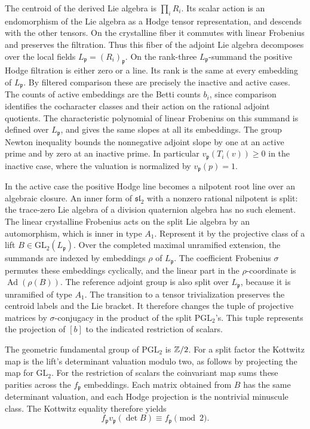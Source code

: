 The centroid of the derived Lie algebra is \(\prod_i R_i\). Its
scalar action is an endomorphism of the Lie algebra as a Hodge tensor
representation, and descends with the other tensors. On the
crystalline fiber it commutes with linear Frobenius and preserves
the filtration. Thus this fiber of the adjoint Lie algebra decomposes
over the local fields \(L_{\mathfrak p}=(R_i)_{\mathfrak p}\).
On the rank-three \(L_{\mathfrak p}\)-summand the positive Hodge
filtration is either zero or a line. Its rank is the same at every
embedding of \(L_{\mathfrak p}\). By filtered comparison these are
precisely the inactive and active cases. The counts of active
embeddings are the Betti counts \(b_i\), since comparison identifies
the cocharacter classes and their action on the rational adjoint
quotients. The characteristic polynomial of linear Frobenius on this
summand is defined over \(L_{\mathfrak p}\), and gives the same slopes
at all its embeddings. The group Newton inequality bounds the
nonnegative adjoint slope by one at an active prime and by zero at an
inactive prime. In particular \(v_{\mathfrak p}(T_i(v))\ge0\) in the
inactive case, where the valuation is normalized by \(v_{\mathfrak p}(p)=1\).

In the active case the positive Hodge line becomes a nilpotent root
line over an algebraic closure. An inner form of \(\mathfrak{sl}_2\)
with a nonzero rational nilpotent is split: the trace-zero Lie
algebra of a division quaternion algebra has no such element. The
linear crystalline Frobenius acts on the split Lie algebra by an
automorphism, which is inner in type \(A_1\). Represent it by the
projective class of a lift \(B\in\mathrm{GL}_2(L_{\mathfrak p})\).
Over the completed maximal unramified extension, the summands are
indexed by embeddings \(\rho\) of \(L_{\mathfrak p}\). The coefficient
Frobenius \(\sigma\) permutes these embeddings cyclically, and the
linear part in the \(\rho\)-coordinate is \(\operatorname{Ad}(\rho(B))\).
The reference adjoint group is also split over \(L_{\mathfrak p}\),
because it is unramified of type \(A_1\). The transition to a tensor
trivialization preserves the centroid labels and the Lie bracket.
It therefore changes the tuple of projective matrices by
\(\sigma\)-conjugacy in the product of the split \(\mathrm{PGL}_2\)'s.
This tuple represents the projection of \([b]\) to the indicated
restriction of scalars.

The geometric fundamental group of \(\mathrm{PGL}_2\) is \(\mathbb Z/2\).
For a split factor the Kottwitz map is the lift's determinant
valuation modulo two, as follows by projecting the map for
\(\mathrm{GL}_2\). For the restriction of scalars the coinvariant
map sums these parities across the \(f_{\mathfrak p}\) embeddings.
Each matrix obtained from \(B\) has the same determinant valuation,
and each Hodge projection is the nontrivial minuscule class. The
Kottwitz equality therefore yields
\[
 f_{\mathfrak p}v_{\mathfrak p}(\det B)\equiv f_{\mathfrak p}\pmod 2.
\]

